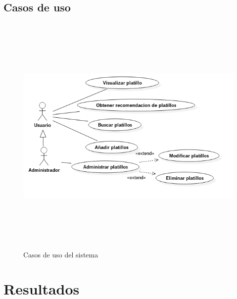    \subsection{Casos de uso}
    \newpage
      \begin{landscape}
        \begin{figure}[h!]
        \centering
        \includegraphics[width=22.5cm,height=12cm]{./images/prototipo2.png}
        \caption{Casos de uso del sistema}
      \end{figure}
      \end{landscape}
    \newpage
    
  \section{Resultados}
    

